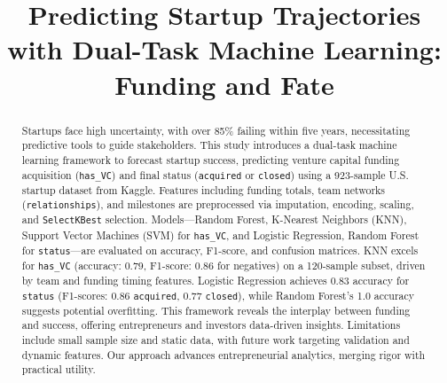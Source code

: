 \documentclass[conference]{IEEEtran}
\begin{document}
\title{Predicting Startup Trajectories with Dual-Task Machine Learning: Funding and Fate}

\author{
     \vspace*{3.0pt}
    \and
     \vspace*{3.0pt}
}

\maketitle

\begin{abstract}
    Startups face high uncertainty, with over 85\% failing within five years, necessitating predictive tools to guide stakeholders. This study introduces a dual-task machine learning framework to forecast startup success, predicting venture capital funding acquisition (\texttt{has\_VC}) and final status (\texttt{acquired} or \texttt{closed}) using a 923-sample U.S. startup dataset from Kaggle. Features including funding totals, team networks (\texttt{relationships}), and milestones are preprocessed via imputation, encoding, scaling, and \texttt{SelectKBest} selection. Models—Random Forest, K-Nearest Neighbors (KNN), Support Vector Machines (SVM) for \texttt{has\_VC}, and Logistic Regression, Random Forest for \texttt{status}—are evaluated on accuracy, F1-score, and confusion matrices. KNN excels for \texttt{has\_VC} (accuracy: 0.79, F1-score: 0.86 for negatives) on a 120-sample subset, driven by team and funding timing features. Logistic Regression achieves 0.83 accuracy for \texttt{status} (F1-scores: 0.86 \texttt{acquired}, 0.77 \texttt{closed}), while Random Forest’s 1.0 accuracy suggests potential overfitting. This framework reveals the interplay between funding and success, offering entrepreneurs and investors data-driven insights. Limitations include small sample size and static data, with future work targeting validation and dynamic features. Our approach advances entrepreneurial analytics, merging rigor with practical utility.
\end{abstract}
\end{document}
